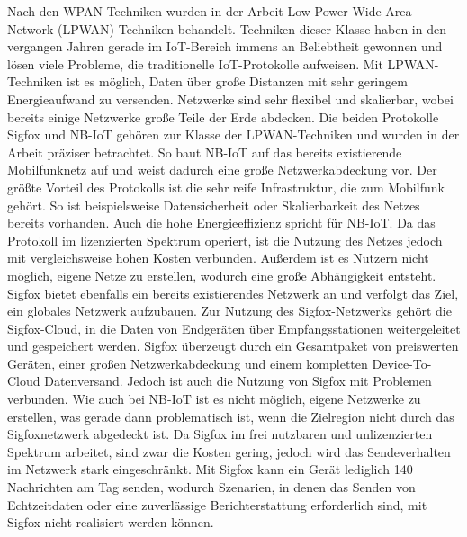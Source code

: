 Nach den WPAN-Techniken wurden in der Arbeit Low Power Wide Area Network (LPWAN) Techniken behandelt. Techniken dieser Klasse haben in den vergangen Jahren gerade im IoT-Bereich immens an Beliebtheit gewonnen und lösen viele Probleme, die traditionelle IoT-Protokolle aufweisen. Mit LPWAN-Techniken ist es möglich, Daten über große Distanzen mit sehr geringem Energieaufwand zu versenden. Netzwerke sind sehr flexibel und skalierbar, wobei bereits einige Netzwerke große Teile der Erde abdecken. Die beiden Protokolle Sigfox und NB-IoT gehören zur Klasse der LPWAN-Techniken und wurden in der Arbeit präziser betrachtet. So baut NB-IoT auf das bereits existierende Mobilfunknetz auf und weist dadurch eine große Netzwerkabdeckung vor. Der größte Vorteil des Protokolls ist die sehr reife Infrastruktur, die zum Mobilfunk gehört. So ist beispielsweise Datensicherheit oder Skalierbarkeit des Netzes bereits vorhanden. Auch die hohe Energieeffizienz spricht für NB-IoT. Da das Protokoll im lizenzierten Spektrum operiert, ist die Nutzung des Netzes jedoch mit vergleichsweise hohen Kosten verbunden. Außerdem ist es Nutzern nicht möglich, eigene Netze zu erstellen, wodurch eine große Abhängigkeit entsteht. Sigfox bietet ebenfalls ein bereits existierendes Netzwerk an und verfolgt das Ziel, ein globales Netzwerk aufzubauen. Zur Nutzung des Sigfox-Netzwerks gehört die Sigfox-Cloud, in die Daten von Endgeräten über Empfangsstationen weitergeleitet und gespeichert werden. Sigfox überzeugt durch ein Gesamtpaket von preiswerten Geräten, einer großen Netzwerkabdeckung und einem kompletten Device-To-Cloud Datenversand. Jedoch ist auch die Nutzung von Sigfox mit Problemen verbunden. Wie auch bei NB-IoT ist es nicht möglich, eigene Netzwerke zu erstellen, was gerade dann problematisch ist, wenn die Zielregion nicht durch das Sigfoxnetzwerk abgedeckt ist. Da Sigfox im frei nutzbaren und unlizenzierten Spektrum arbeitet, sind zwar die Kosten gering, jedoch wird das Sendeverhalten im Netzwerk stark eingeschränkt. Mit Sigfox kann ein Gerät lediglich 140 Nachrichten am Tag senden, wodurch Szenarien, in denen das Senden von Echtzeitdaten oder eine zuverlässige Berichterstattung erforderlich sind, mit Sigfox nicht realisiert werden können.


